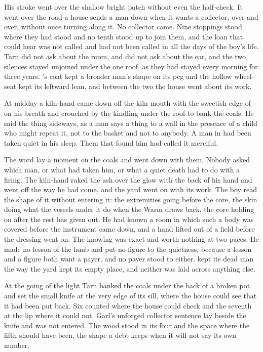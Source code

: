 His stroke went over the shallow bright patch without even the half-check. It went over the road a house sends a man down when it wants a collector, over and over, without once turning along it. No collector came. Nine stoppings stood where they had stood and no tenth stood up to join them, and the loan that could hear was not called and had not been called in all the days of the boy's life. Tarn did not ask about the room, and  did not ask about the ear, and the two silences stayed unjoined under the one roof, as they had stayed every morning for three years. 's coat kept a broader man's shape on its peg and the hollow wheel-seat kept its leftward lean, and between the two the house went about its work.

\scenebreak

At midday a kiln-hand came down off the kiln mouth with the sweetish edge of  on his breath and crouched by the kindling under the roof to bank the coals. He said the thing sideways, as a man says a thing to a wall in the presence of a child who might repeat it, not to the basket and not to anybody. A man in  had been taken quiet in his sleep. Them that found him had called it merciful.

The word lay a moment on the coals and went down with them. Nobody asked which man, or what had taken him, or what a quiet death had to do with a firing. The kiln-hand raked the ash over the glow with the back of his hand and went off the way he had come, and the yard went on with its work. The boy read the shape of it without entering it: the extremities going before the core, the skin doing what the vessels under it do when the Warm draws back, the core holding on after the rest has given out. He had known a room in which such a body was covered before the instrument came down, and a hand lifted out of a field before the dressing went on. The knowing was exact and worth nothing at two paces. He made no lesson of the lamb and put no figure to the quietness, because a lesson and a figure both want a payer, and no payer stood to either.  kept its dead man the way the yard kept its empty place, and neither was laid across anything else.

At the going of the light Tarn banked the coals under the back of a broken pot and set the small knife at the very edge of its sill, where the house could see that it had been put back. Six counted where the house could check and the seventh at the lip where it could not. Garl's unforged collector sentence lay beside the knife and was not entered. The wood stood in its four and the space where the fifth should have been, the shape a debt keeps when it will not say its own number.

